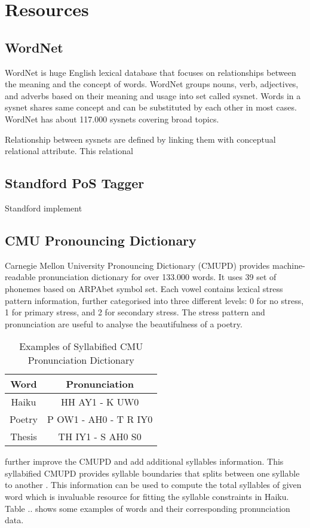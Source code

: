 \section{Resources}

\subsection{WordNet}

WordNet is huge English lexical database that focuses on relationships between the meaning and the concept of words. WordNet groups nouns, verb, adjectives, and adverbs based on their meaning and usage into set called sysnet. Words in a sysnet shares same concept and can be substituted by each other in most cases. WordNet has about 117.000 sysnets covering broad topics.

Relationship between sysnets are defined by linking them with conceptual relational attribute. This relational


\subsection{Standford PoS Tagger}

Standford implement


\subsection{CMU Pronouncing Dictionary}

Carnegie Mellon University Pronouncing Dictionary (CMUPD) provides machine-readable pronunciation dictionary for over 133.000 words. It uses 39 set of phonemes based on ARPAbet symbol set. Each vowel contains lexical stress pattern information, further categorised into three different levels: 0 for no stress, 1 for primary stress, and 2 for secondary stress\cite{CMUDict}. The stress pattern and pronunciation are useful to analyse the beautifulness of a poetry.

\begin{table}
	\centering
	
	\begin{tabular}{|c|c|}
		\hline  \textbf{Word} & \textbf{Pronunciation} \\ 
		\hline Haiku  & HH AY1 - K UW0\\
		\hline Poetry  & P OW1 - AH0 - T R IY0 \\
		\hline Thesis  &  TH IY1 - S AH0 S0 \\
		\hline
	\end{tabular} 
	\label{Sylla}
	\caption{Examples of Syllabified CMU Pronunciation Dictionary}
\end{table}

\citeauthor{bartlett2009syllabification} further improve the CMUPD and add additional syllables information. This syllabified CMUPD provides syllable boundaries that splits between one syllable to another \cite{bartlett2009syllabification}. This information can be used to compute the total syllables of given word which is invaluable resource for fitting the syllable constraints in Haiku. Table .. shows some examples of words and their corresponding pronunciation data.

